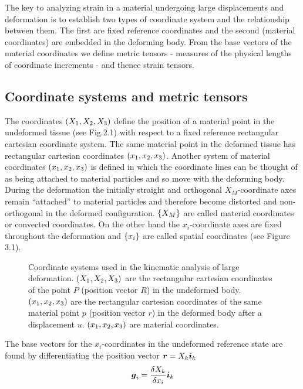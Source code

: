 The key to analyzing strain in a material
undergoing large displacements and deformation is to establish two types of
coordinate system and the relationship between them. The first are fixed
reference coordinates and the second (material coordinates) are embedded in
the deforming body. From the base vectors of the material coordinates we
define metric tensors - measures of the physical lengths of coordinate
increments - and thence strain tensors.
 
\subsection{Coordinate systems and metric tensors}
The coordinates $\left( X_{1},X_{2},X_{3} \right)$ define the position of a material point
in the undeformed tissue (see Fig.2.1)  with 
respect to a fixed reference
rectangular cartesian coordinate system. The same material point in the
deformed tissue has rectangular cartesian coordinates $\left( x_{1},x_{2},x_{3} \right)$.
Another system of material coordinates $\left( x_{1},x_{2},x_{3} \right)$ is defined in
which the coordinate lines can be thought of as being attached to material
particles and so move with the deforming body. During the deformation the
initially straight and orthogonal $X_{M}$-coordinate axes remain ``attached''
to material particles and therefore become distorted and non-orthogonal in the
deformed configuration. $\left\{ X_{M} \right\}$ are called material coordinates or
convected coordinates. On the other hand the $x_{i}$-coordinate axes are fixed
throughout the deformation and $\left\{ x_{i} \right\}$ are called spatial coordinates (see
Figure 3.1).
\begin{figure} \centering
  \caption{Coordinate systems used in the kinematic
    analysis of large deformation. $\left( X_{1},X_{2},X_{3} \right)$ are the
    rectangular cartesian coordinates of the point $P$
    (position vector $R$) in the undeformed body. $\left( x_{1},x_{2},x_{3} \right)$
    are the rectangular cartesian coordinates of the same
    material point $p$ (position vector $r$) in the deformed
    body after a displacement $u$. $\left( x_{1},x_{2},x_{3} \right)$ are material
    coordinates.}
  \label{fig:coord}
\end{figure} 

The base vectors for the $x_{i}$-coordinates in the undeformed reference state
are found by differentiating the position vector $\vect{R}=X_{k}\vect{i}_{k}$
\begin{equation}
  \vect{G}_{i} = \dfrac{\delta X_{k}}{\delta x_{i}} \vect{i}_{k}
  \label{eq:pv}
\end{equation}

